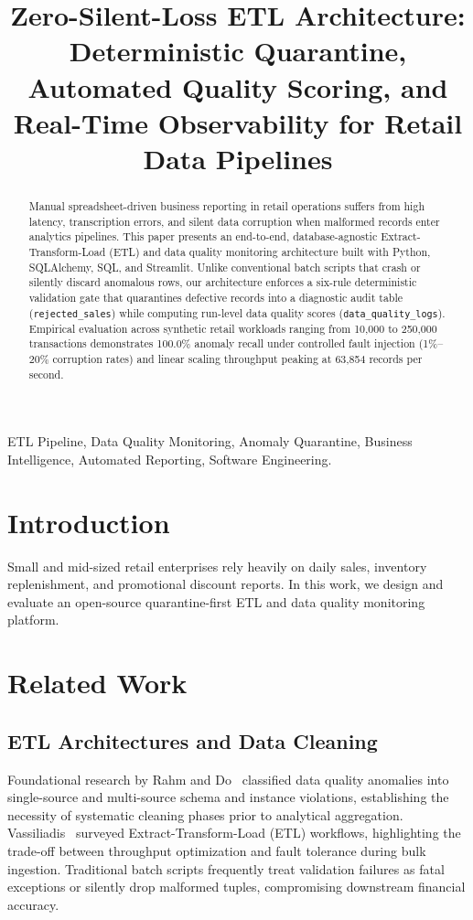 \documentclass[conference]{IEEEtran}
\title{Zero-Silent-Loss ETL Architecture: Deterministic Quarantine, Automated Quality Scoring, and Real-Time Observability for Retail Data Pipelines}
\author{\IEEEauthorblockN{Moses Kiprono}
\IEEEauthorblockA{\textit{Data Engineering and Analytics Research} \\
Code Repository: \url{https://github.com/moseswebdev/automated-data-pipeline}}}
\begin{document}
\maketitle

\begin{abstract}
Manual spreadsheet-driven business reporting in retail operations suffers from high latency, transcription errors, and silent data corruption when malformed records enter analytics pipelines. This paper presents an end-to-end, database-agnostic Extract-Transform-Load (ETL) and data quality monitoring architecture built with Python, SQLAlchemy, SQL, and Streamlit. Unlike conventional batch scripts that crash or silently discard anomalous rows, our architecture enforces a six-rule deterministic validation gate that quarantines defective records into a diagnostic audit table (\texttt{rejected_sales}) while computing run-level data quality scores (\texttt{data_quality_logs}). Empirical evaluation across synthetic retail workloads ranging from 10,000 to 250,000 transactions demonstrates 100.0\% anomaly recall under controlled fault injection (1\%--20\% corruption rates) and linear scaling throughput peaking at 63,854 records per second.
\end{abstract}

\begin{IEEEkeywords}
ETL Pipeline, Data Quality Monitoring, Anomaly Quarantine, Business Intelligence, Automated Reporting, Software Engineering.
\end{IEEEkeywords}
\section{Introduction}
Small and mid-sized retail enterprises rely heavily on daily sales, inventory replenishment, and promotional discount reports. In this work, we design and evaluate an open-source quarantine-first ETL and data quality monitoring platform.

\section{Related Work}
\subsection{ETL Architectures and Data Cleaning}
Foundational research by Rahm and Do~\cite{rahm2000data} classified data quality anomalies into single-source and multi-source schema and instance violations, establishing the necessity of systematic cleaning phases prior to analytical aggregation. Vassiliadis~\cite{vassiliadis2009survey} surveyed Extract-Transform-Load (ETL) workflows, highlighting the trade-off between throughput optimization and fault tolerance during bulk ingestion. Traditional batch scripts frequently treat validation failures as fatal exceptions or silently drop malformed tuples, compromising downstream financial accuracy.
\end{document}
